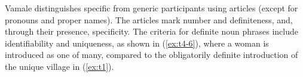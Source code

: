 %
%
%
%
%
%
%
%
%
%
%
%
%
%
%
%
%

Vamale distinguishes specific from generic participants using articles (except for pronouns and proper names). The articles mark number and definiteness, and, through their presence, specificity. The criteria for definite noun phrases include identifiability and uniqueness, as shown in (\ref{ex:t4-6}), where a woman is introduced as one of many, compared to the obligatorily definite introduction of the unique village in (\ref{ex:t1}).

